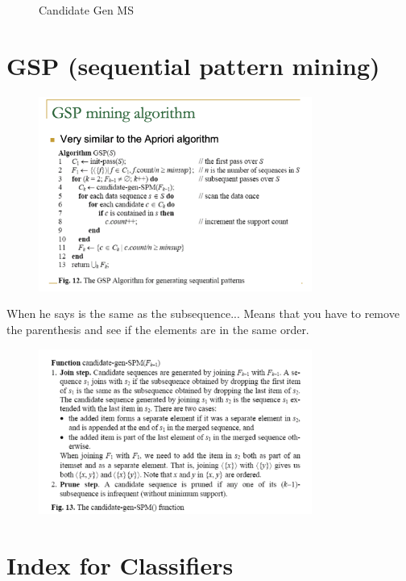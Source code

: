 \documentclass[10pt,oneside,a4paper]{article}
\begin{document}
\begin{figure}[H]
\begin{minipage}[t]{0.32\textwidth}
        \caption{Candidate Gen MS}
    \end{minipage}
\end{figure}


\section{GSP (sequential pattern mining)}
\begin{figure}[H]
    \centering
    \includegraphics[width=0.8\textwidth]{Images/GSP1.png}
\end{figure}
When he says is the same as the subsequence... Means that you have to remove the parenthesis and see if the elements are in the same order.
\begin{figure}[H]
    \centering
    \includegraphics[width=0.8\textwidth]{Images/GSP.png}
\end{figure}

\section{Index for Classifiers}
\end{document}
